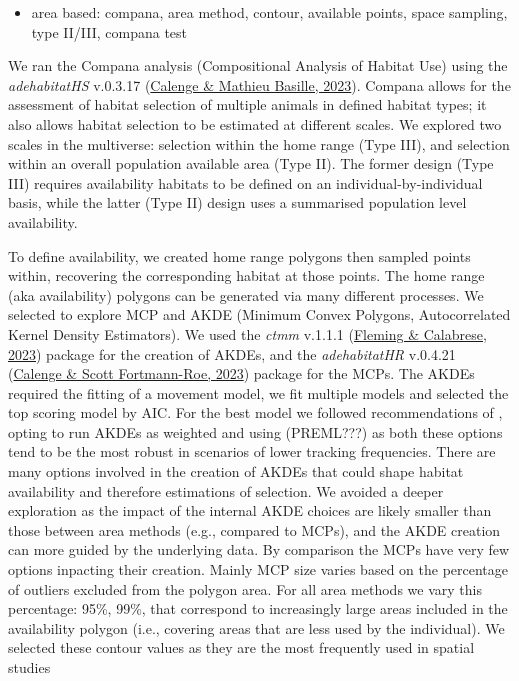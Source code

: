 \documentclass[10pt,a4paper]{article}
\providecommand{\tightlist}{%
  \setlength{\itemsep}{0pt}\setlength{\parskip}{0pt}}
\begin{document}
\begin{itemize}
\tightlist
\item
  area based: compana, area method, contour, available points, space sampling, type II/III, compana test
\end{itemize}

We ran the Compana analysis (Compositional Analysis of Habitat Use) using the \emph{adehabitatHS} v.0.3.17 (\protect\hyperlink{ref-adehabitatHS}{Calenge \& Mathieu Basille, 2023}).
Compana allows for the assessment of habitat selection of multiple animals in defined habitat types; it also allows habitat selection to be estimated at different scales.
We explored two scales in the multiverse: selection within the home range (Type III), and selection within an overall population available area (Type II).
The former design (Type III) requires availability habitats to be defined on an individual-by-individual basis, while the latter (Type II) design uses a summarised population level availability.

To define availability, we created home range polygons then sampled points within, recovering the corresponding habitat at those points.
The home range (aka availability) polygons can be generated via many different processes.
We selected to explore MCP and AKDE (Minimum Convex Polygons, Autocorrelated Kernel Density Estimators).
We used the \emph{ctmm} v.1.1.1 (\protect\hyperlink{ref-ctmm}{Fleming \& Calabrese, 2023}) package for the creation of AKDEs, and the \emph{adehabitatHR} v.0.4.21 (\protect\hyperlink{ref-adehabitatHR}{Calenge \& Scott Fortmann-Roe, 2023}) package for the MCPs.
The AKDEs required the fitting of a movement model, we fit multiple models and selected the top scoring model by AIC.
For the best model we followed recommendations of , opting to run AKDEs as weighted and using (PREML???) as both these options tend to be the most robust in scenarios of lower tracking frequencies.
There are many options involved in the creation of AKDEs that could shape habitat availability and therefore estimations of selection.
We avoided a deeper exploration as the impact of the internal AKDE choices are likely smaller than those between area methods (e.g., compared to MCPs), and the AKDE creation can more guided by the underlying data.
By comparison the MCPs have very few options inpacting their creation.
Mainly MCP size varies based on the percentage of outliers excluded from the polygon area.
For all area methods we vary this percentage: 95\%, 99\%, that correspond to increasingly large areas included in the availability polygon (i.e., covering areas that are less used by the individual).
We selected these contour values as they are the most frequently used in spatial studies
\end{document}
